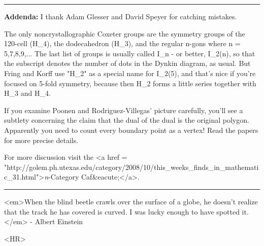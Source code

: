 \par\noindent\rule{\textwidth}{0.4pt}
\textbf{Addenda:} I thank Adam Glesser and David Speyer for catching 
mistakes.

The only noncrystallographic Coxeter groups are the
symmetry groups of the 120-cell (H_{4}), the dodecahedron
(H_{3}), and the regular n-gons where n = 5,7,8,9,...  The last
list of groups is usually called I_{n} - or better,
I_{2}(n), so that the subscript denotes the number of dots in
the Dynkin diagram, as usual.  But Fring and Korff use "H_{2}"
as a special name for I_{2}(5), and that's nice if you're
focused on 5-fold symmetry, because then H_{2} forms a little
series together with H_{3} and H_{4}.

If you examine Poonen and Rodriguez-Villegas' picture
carefully, you'll see a subtlety
concerning the claim that the dual of the dual is the original
polygon.  Apparently you need to count every boundary point as a vertex!
Read the papers for more precise details.

For more discussion visit the <a href = "http://golem.ph.utexas.edu/category/2008/10/this_weeks_finds_in_mathematic_31.html">\emph{n}-Category
Caf&eacute;</a>.

\par\noindent\rule{\textwidth}{0.4pt}
<em>When the blind beetle crawls over the surface of a globe, he doesn't
realize that the track he has covered is curved.  I was lucky enough
to have spotted it.</em> - Albert Einstein

<HR>



